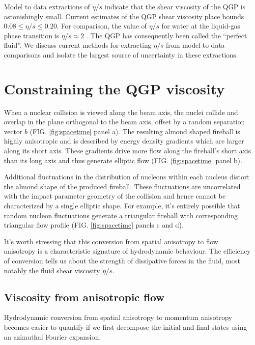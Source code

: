 \documentclass[aps,prc,reprint,amsmath,nofootinbib]{revtex4-1}
\begin{document}
Model to data extractions of $\eta/s$ indicate that the shear viscosity of the QGP is astonishingly small. Current estimates of the QGP shear viscosity place bounds 
$0.08 \le \eta/s \le 0.20$. For comparison, the value of $\eta/s$ for water at the liquid-gas phase transition is $\eta/s \approx 2$ \cite{bhalerao:2014owa}. The QGP has consequently been called the 
``perfect fluid''. We discuss current methods for extracting $\eta/s$ from model to data comparisons and isolate the largest source of uncertainty in these extractions.

\section{Constraining the QGP viscosity}

When a nuclear collision is viewed along the beam axis, the nuclei collide and overlap in the plane orthogonal to the beam axis, offset by a random separation vector $b$ 
(FIG. \ref{fig:spacetime} panel a). The resulting almond shaped fireball is highly anisotropic and is described by energy density gradients which are larger along its short axis. These 
gradients drive more flow along the fireball's short axis than its long axis and thus generate elliptic flow (FIG. \ref{fig:spacetime} panel b).

Additional fluctuations in the distribution of nucleons within each nucleus distort the almond shape of the produced fireball. These fluctuations are uncorrelated with the 
impact parameter geometry of the collision and hence cannot be characterized by a single elliptic shape. For example, it's entirely possible that random nucleon fluctuations
generate a triangular fireball with corresponding triangular flow profile (FIG. \ref{fig:spacetime} panels c and d). 

It's worth stressing that this conversion from spatial anisotropy to flow anisotropy is a characteristic signature of hydrodynamic behaviour. The efficiency of conversion
tells us about the strength of dissipative forces in the fluid, most notably the fluid shear viscosity $\eta/s$.

\subsection{Viscosity from anisotropic flow}

Hydrodynamic conversion from spatial anisotropy to momentum anisotropy becomes easier to quantify if we first decompose the initial and final states using an azimuthal 
Fourier expansion. 
\end{document}
